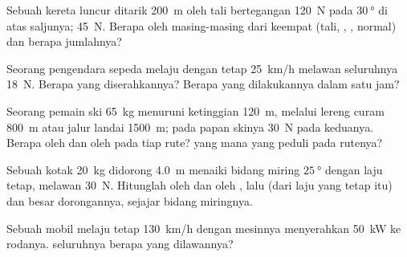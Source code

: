 \begin{exercise}[$\star\star$]\label{exo:g11:work-of-force:6}
Sebuah kereta luncur ditarik \qty{200}{m} oleh tali bertegangan
\qty{120}{N} pada $\qty{30}{\degree}$ di atas saljunya; 
\qty{45}{N}. Berapa  oleh masing-masing dari keempat 
(tali, , , normal) dan berapa jumlahnya?
\end{exercise}

\begin{exercise}[$\star\star$]\label{exo:g11:work-of-force:7}
Seorang pengendara sepeda melaju dengan tetap \qty{25}{km/h} melawan
 seluruhnya \qty{18}{N}. Berapa  yang diserahkannya? Berapa
 yang dilakukannya dalam satu jam?
\end{exercise}

\begin{exercise}[$\star\star$]\label{exo:g11:work-of-force:8}
Seorang pemain ski \qty{65}{kg} menuruni ketinggian \qty{120}{m},
melalui lereng curam \qty{800}{m} atau jalur landai \qty{1500}{m};
 pada papan skinya \qty{30}{N} pada keduanya. Berapa  oleh
 dan  oleh  pada tiap rute?  yang mana yang
peduli pada rutenya?
\end{exercise}

\begin{exercise}[$\star\star$]\label{exo:g11:work-of-force:9}
Sebuah kotak \qty{20}{kg} didorong \qty{4.0}{m} menaiki bidang miring
$\qty{25}{\degree}$ dengan laju tetap, melawan  \qty{30}{N}.
Hitunglah  oleh  dan  oleh , lalu (dari
laju yang tetap itu)  dan besar dorongannya, sejajar bidang
miringnya.
\end{exercise}

\begin{exercise}[$\star\star$]\label{exo:g11:work-of-force:10}
Sebuah mobil melaju tetap \qty{130}{km/h} dengan mesinnya menyerahkan
\qty{50}{kW} ke rodanya.   seluruhnya berapa yang
dilawannya?
\end{exercise}

